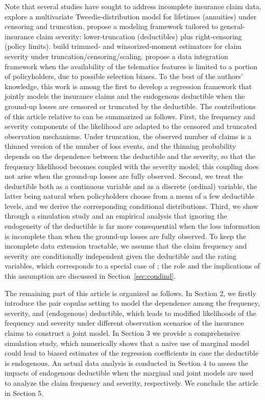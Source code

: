 \documentclass[11pt]{article}
\newcommand{\rev}[1]{{\color{blue}#1}}
\begin{document}
Note that several studies have sought to address incomplete insurance claim data. \citet{alai2015multivariate} explore a multivariate Tweedie‐distribution model for lifetimes (annuities) under censoring and truncation.  \citet{gatti2025modeling} propose a modeling framework tailored to general-insurance claim severity: lower‐truncation (deductibles) plus right‐censoring (policy limits). \citet{Poudyal2022Robust} build trimmed‐ and winsorized‐moment estimators for claim severity under truncation/censoring/scaling. \citet{peiris2024integration} propose a data integration framework when the availability of the telematics features is limited to a portion of policyholders, due to possible selection biases.  \rev{To the best of the authors' knowledge, this work is among the first to develop a regression framework that jointly models the insurance claims and the endogenous deductible when the ground-up losses are censored or truncated by the deductible. The contributions of this article relative to \citet{shi2022copula} can be summarized as follows. First, the frequency and severity components of the likelihood are adapted to the censored and truncated observation mechanisms. Under truncation, the observed number of claims is a thinned version of the number of loss events, and the thinning probability depends on the dependence between the deductible and the severity, so that the frequency likelihood becomes coupled with the severity model; this coupling does not arise when the ground-up losses are fully observed. Second, we treat the deductible both as a continuous variable and as a discrete (ordinal) variable, the latter being natural when policyholders choose from a menu of a few deductible levels, and we derive the corresponding conditional distributions. Third, we show through a simulation study and an empirical analysis that ignoring the endogeneity of the deductible is far more consequential when the loss information is incomplete than when the ground-up losses are fully observed. To keep the incomplete data extension tractable, we assume that the claim frequency and severity are conditionally independent given the deductible and the rating variables, which corresponds to a special case of \citet{shi2022copula}; the role and the implications of this assumption are discussed in Section~\ref{sec:condind}.}




The remaining part of this article is organized as follows.  In Section 2, we firstly introduce the pair copulas setting to model the dependence among the frequency, severity, and (endogenous) deductible, which leads to modified likelihoods of the frequency and severity under different \rev{observation} scenarios \rev{of the insurance claims} to construct a joint model. In Section 3 we provide a comprehensive simulation study, which numerically shows that a naive use of marginal model could lead to biased estimates of the regression coefficients in case the deductible is endogenous.  An actual data analysis is conducted in Section 4 to assess the impacts of endogenous deductible when the marginal and joint models are used to analyze the claim frequency and severity, respectively. We conclude the article in Section 5.
\end{document}
